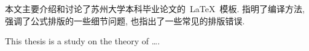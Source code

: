 \begin{cnabstract}
本文主要介绍和讨论了苏州大学本科毕业论文的~\LaTeX~模板.
指明了编译方法, 强调了公式排版的一些细节问题, 也指出了一些常见的排版错误.

\end{cnabstract}
\par
\vspace*{2em}



\begin{enabstract}
This thesis is a study on the theory of \dots.
\end{enabstract}
\par
\vspace*{2em}
 \enkeywords{\LaTeX{};  }
